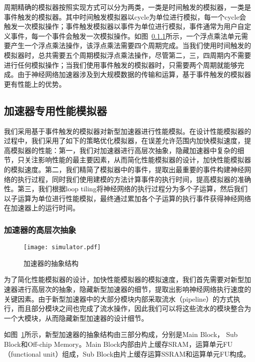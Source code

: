 周期精确的模拟器按照实现方式可以分为两类，一类是时间触发的模拟器，一类是事件触发的模拟器。其中时间触发模拟器以cycle为单位进行模拟，每一个cycle会触发一次模拟操作；事件触发模拟器以事件为单位进行模拟，事件通常为用户自定义事件，每一个事件会触发一次模拟操作。如图~\ref{}所示，一个浮点乘法单元需要产生一个浮点乘法操作，该浮点乘法需要四个周期完成。当我们使用时间触发的模拟器时，总共需要五个周期模拟浮点乘法操作，尽管第二，三，四周期内不需要进行任何模拟操作；当我们使用事件触发的模拟器时，只需要两个周期就能够完成。由于神经网络加速器涉及到大规模数据的传输和运算，基于事件触发的模拟器更有性能上的优势。

\subsection{加速器专用性能模拟器}

我们采用基于事件触发的模拟器对新型加速器进行性能模拟。在设计性能模拟器的过程中，我们采用了如下的策略优化模拟器，在误差允许范围内加快模拟速度，提高模拟器的性能：第一，我们对加速器进行高层次抽象，隐藏加速器中复杂的细节，只关注影响性能的最主要因素，从而简化性能模拟器的设计，加快性能模拟器的模拟速度。第二，我们精简了模拟器中的事件，提取出最重要的事件构建神经网络的执行过程，同时我们使用建模的方法计算事件的执行时间，提高模拟器的准确性。第三，我们根据loop tiling将神经网络的执行过程分为多个子运算，然后我们以子运算为单位进行性能模拟，最终通过累加各个子运算的执行事件获得神经网络在加速器上的运行时间。


\subsubsection{加速器的高层次抽象}

\begin{figure}[h]
\centering
\texttt{[image: simulator.pdf]}
\caption{加速器的抽象结构}
\label{fig:simulator}
\end{figure}

为了简化性能模拟器的设计，加快性能模拟器的模拟速度，我们首先需要对新型加速器进行高层次的抽象，隐藏新型加速器的细节，提取出影响神经网络执行速度的关键因素。由于新型加速器中的大部分模块内部采取流水（pipeline）的方式执行，而且部分模块之间也完成了流水操作，因此我们可以将这些流水的模块整合为一个大模块，从而隐藏新型加速器的设计细节。

如图~\ref{fig:simulator}所示，新型加速器的抽象结构由三部分构成，分别是Main Block， Sub Block和Off-chip Memory。Main Block内部由片上缓存SRAM，运算单元FU（functional unit）组成，Sub Block由片上缓存运算SSRAM和运算单元FU构成。

